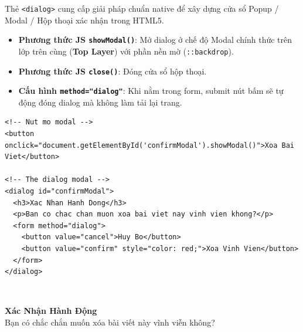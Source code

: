 \documentclass[11pt,oneside]{book}
\newcommand{\codeinline}[1]{\textcolor{accentOrange}{\texttt{#1}}}
\newcommand{\term}[1]{\textbf{\textcolor{primaryBlue}{#1}}}
\begin{document}
\begin{conceptBox}
Thẻ \codeinline{<dialog>} cung cấp giải pháp chuẩn native để xây dựng cửa sổ Popup / Modal / Hộp thoại xác nhận trong HTML5.
\begin{itemize}[leftmargin=1.5em, itemsep=2pt, parsep=0pt]
    \item \textbf{Phương thức JS \codeinline{showModal()}}: Mở dialog ở chế độ Modal chính thức trên lớp trên cùng (\term{Top Layer}) với phần nền mờ (\codeinline{::backdrop}).
    \item \textbf{Phương thức JS \codeinline{close()}}: Đóng cửa sổ hộp thoại.
    \item \textbf{Cấu hình \codeinline{method="dialog"}}: Khi nằm trong form, submit nút bấm sẽ tự động đóng dialog mà không làm tải lại trang.
\end{itemize}
\end{conceptBox}

\begin{codeWindow}
\begin{lstlisting}[language=HTML5]
<!-- Nut mo modal -->
<button onclick="document.getElementById('confirmModal').showModal()">Xoa Bai Viet</button>

<!-- The dialog modal -->
<dialog id="confirmModal">
  <h3>Xac Nhan Hanh Dong</h3>
  <p>Ban co chac chan muon xoa bai viet nay vinh vien khong?</p>
  <form method="dialog">
    <button value="cancel">Huy Bo</button>
    <button value="confirm" style="color: red;">Xoa Vinh Vien</button>
  </form>
</dialog>
\end{lstlisting}
\end{codeWindow}

\begin{browserWindow}
\sffamily\small
{} \\[10pt]

\begin{center}
\begin{tcolorbox}[arc=4pt, colback=white, colframe=primaryBlue, boxsep=8pt, width=0.85\linewidth, halign=center]
  \textbf{\textcolor{primaryBlue}{Xác Nhận Hành Động}} \\[4pt]
  {\small Bạn có chắc chắn muốn xóa bài viết này vĩnh viễn không?} \\[8pt]
   \qquad
\end{tcolorbox}
\end{center}
\end{browserWindow}
\end{document}

